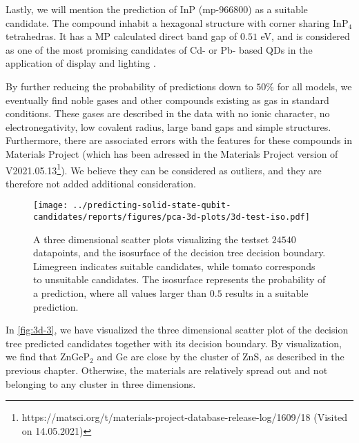 Lastly, we will mention the prediction of InP (mp-$966800$) as a suitable candidate. The compound inhabit a hexagonal structure with corner sharing InP$_4$ tetrahedras. It has a MP calculated direct band gap of $0.51$ eV, and is considered as one of the most promising candidates of Cd- or Pb- based QDs in the application of display and lighting \cite{Zhang2020a, Won2019}.

By further reducing the probability of predictions down to $50\%$ for all models, we eventually find noble gases and other compounds existing as gas in standard conditions. These gases are described in the data with no ionic character, no electronegativity, low covalent radius, large band gaps and simple structures. Furthermore, there are associated errors with the features for these compounds in Materials Project (which has been adressed in the Materials Project version of V2021.05.13\footnote{https://matsci.org/t/materials-project-database-release-log/1609/18 (Visited on 14.05.2021)}). We believe they can be considered as outliers, and they are therefore not added additional consideration.


\begin{figure}[ht!]
    \centering
    \texttt{[image: ../predicting-solid-state-qubit-candidates/reports/figures/pca-3d-plots/3d-test-iso.pdf]}
    \vspace*{-130mm}
    \caption{A three dimensional scatter plots visualizing the testset $24540$ datapoints, and the isosurface of the decision tree decision boundary. Limegreen indicates suitable candidates, while tomato corresponds to unsuitable candidates. The isosurface represents the probability of a prediction, where all values larger than $0.5$ results in a suitable prediction.}
    \label{fig:3d-3}
\end{figure}

In \autoref{fig:3d-3}, we have visualized the three dimensional scatter plot of the decision tree predicted candidates together with its decision boundary. By visualization, we find that ZnGeP$_2$ and Ge are close by the cluster of ZnS, as described in the previous chapter. Otherwise, the materials are relatively spread out and not belonging to any cluster in three dimensions.

